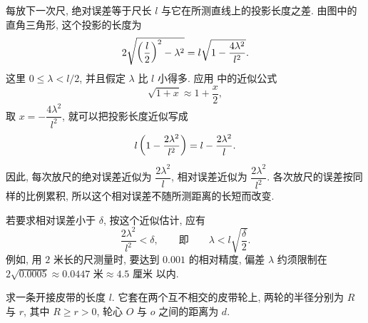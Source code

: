每放下一次尺, 绝对误差等于尺长 $l$ 与它在所测直线上的投影长度之差.
由图中的直角三角形, 这个投影的长度为
$$
2\sqrt{\left( \frac l2 \right)^2-\lambda^2}
=l\sqrt{1-\frac{4\lambda^2}{l^2}}.
$$
这里 $0\leq\lambda<l/2$, 并且假定 $\lambda$ 比 $l$ 小得多.
应用  中的近似公式
$$
\sqrt{1+x}\approx1+\frac x2,
$$
取 $x=-\dfrac{4\lambda^2}{l^2}$, 就可以把投影长度近似写成
$$
l\left( 1-\frac{2\lambda^2}{l^2} \right)
=l-\frac{2\lambda^2}{l}.
$$
因此, 每次放尺的绝对误差近似为 $\dfrac{2\lambda^2}{l}$,
相对误差近似为 $\dfrac{2\lambda^2}{l^2}$.
各次放尺的误差按同样的比例累积, 所以这个相对误差不随所测距离的长短而改变.

若要求相对误差小于 $\delta$, 按这个近似估计, 应有
$$
\frac{2\lambda^2}{l^2}<\delta,
\qquad\text{即}\qquad
\lambda<l\sqrt{\frac\delta2}.
$$
例如, 用 $2$ 米长的尺测量时, 要达到 $0.001$ 的相对精度,
偏差 $\lambda$ 约须限制在
$
2\sqrt{0.0005}\approx0.0447\text{ 米}\approx4.5\text{ 厘米}
$
以内.

\label{ex:open_belt_length}
求一条开接皮带的长度 $l$.
它套在两个互不相交的皮带轮上, 两轮的半径分别为 $R$ 与 $r$,
其中 $R\geq r>0$, 轮心 $O$ 与 $o$ 之间的距离为 $d$.

